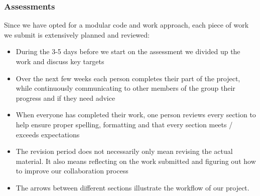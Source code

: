 \documentclass[coverpage,lineno]{../custom}
\begin{document}
\subsubsection{Assessments}
Since we have opted for a modular code and work approach, each piece of work we submit is extensively planned and reviewed:
\begin{itemize}
    \item During the 3-5 days before we start on the assessment we divided up the work and discuss key targets
    \item Over the next few weeks each person completes their part of the project, while continuously communicating to other members of the group their progress and if they need advice
    \item When everyone has completed their work, one person reviews every section to help ensure proper spelling, formatting and that every section meets / exceeds expectations
    \item The revision period does not necessarily only mean revising the actual material. It also means reflecting on the work submitted and figuring out how to improve our collaboration process
    \item The arrows between different sections illustrate the workflow of our project. 
\end{itemize}
\end{document}

